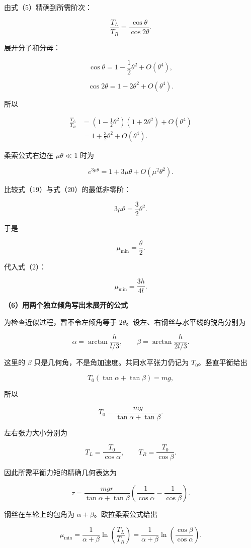 \documentclass[12pt,a4paper,UTF8]{ctexart}
\begin{document}
由式（5）精确到所需阶次：

\[
\frac{T_L}{T_R}
=\frac{\cos\theta}{\cos2\theta}.
\tag{18}
\]

展开分子和分母：

\[
\cos\theta=1-\frac12\theta^2+O(\theta^4),
\]

\[
\cos2\theta=1-2\theta^2+O(\theta^4).
\]

所以

\[
\begin{aligned}
\frac{T_L}{T_R}
&=\left(1-\frac12\theta^2\right)
\left(1+2\theta^2\right)+O(\theta^4)\\
&=1+\frac32\theta^2+O(\theta^4).
\end{aligned}
\tag{19}
\]

柔索公式右边在 \(\mu\theta\ll1\) 时为

\[
e^{3\mu\theta}
=1+3\mu\theta+O(\mu^2\theta^2).
\tag{20}
\]

比较式（19）与式（20）的最低非零阶：

\[
3\mu\theta=\frac32\theta^2.
\]

于是

\[
\mu_{\min}=\frac\theta2.
\]

代入式（2）：

\[
\boxed{
\mu_{\min}=\frac{3h}{4l}
}.
\tag{21}
\]

\textbf{（6）用两个独立倾角写出未展开的公式}

为检查近似过程，暂不令左倾角等于
\(2\theta\)。设左、右钢丝与水平线的锐角分别为

\[
\alpha=\arctan\frac{h}{l/3},
\qquad
\beta=\arctan\frac{h}{2l/3}.
\tag{22}
\]

这里的 \(\beta\) 只是几何角，不是角加速度。共同水平张力仍记为
\(T_0\)。竖直平衡给出

\[
T_0(\tan\alpha+\tan\beta)=mg,
\]

所以

\[
T_0=\frac{mg}{\tan\alpha+\tan\beta}.
\tag{23}
\]

左右张力大小分别为

\[
T_L=\frac{T_0}{\cos\alpha},
\qquad
T_R=\frac{T_0}{\cos\beta}.
\tag{24}
\]

因此所需平衡力矩的精确几何表达为

\[
\boxed{
\tau
=\frac{mgr}{\tan\alpha+\tan\beta}
\left(
\frac1{\cos\alpha}-\frac1{\cos\beta}
\right)
}.
\tag{25}
\]

钢丝在车轮上的包角为 \(\alpha+\beta\)。欧拉柔索公式给出

\[
\boxed{
\mu_{\min}
=\frac1{\alpha+\beta}
\ln\left(\frac{T_L}{T_R}\right)
=\frac1{\alpha+\beta}
\ln\left(\frac{\cos\beta}{\cos\alpha}\right)
}.
\tag{26}
\]
\end{document}
